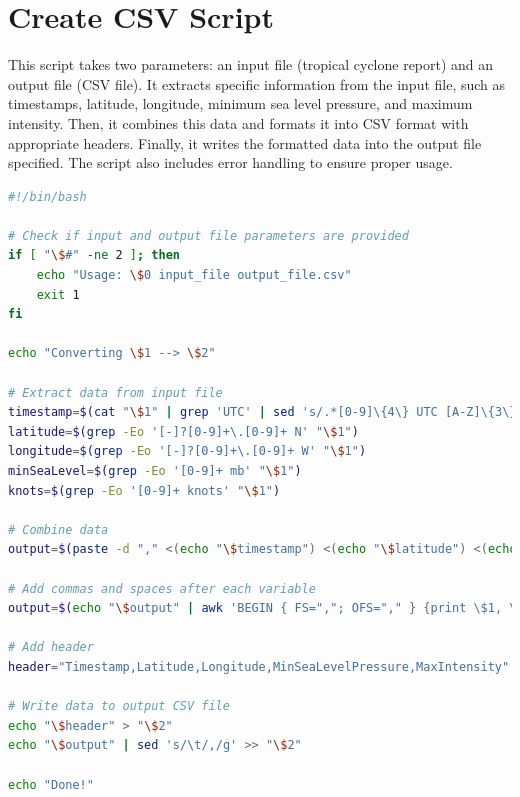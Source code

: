 \documentclass[]{article}
\begin{document}
\section{Create CSV Script}
\vspace{2cm}
This script takes two parameters: an input file (tropical cyclone report) and an output file (CSV file). It extracts specific information from the input file, such as timestamps, latitude, longitude, minimum sea level pressure, and maximum intensity. Then, it combines this data and formats it into CSV format with appropriate headers. Finally, it writes the formatted data into the output file specified. The script also includes error handling to ensure proper usage.
\vspace{1cm}
\begin{lstlisting}[language=bash, caption={create\_csv.sh}]
#!/bin/bash

# Check if input and output file parameters are provided
if [ "\$#" -ne 2 ]; then
    echo "Usage: \$0 input_file output_file.csv"
    exit 1
fi

echo "Converting \$1 --> \$2"

# Extract data from input file
timestamp=$(cat "\$1" | grep 'UTC' | sed 's/.*[0-9]\{4\} UTC [A-Z]\{3\} [0-9]\{2\}.*/\1/' | uniq)
latitude=$(grep -Eo '[-]?[0-9]+\.[0-9]+ N' "\$1")
longitude=$(grep -Eo '[-]?[0-9]+\.[0-9]+ W' "\$1")
minSeaLevel=$(grep -Eo '[0-9]+ mb' "\$1")
knots=$(grep -Eo '[0-9]+ knots' "\$1")

# Combine data
output=$(paste -d "," <(echo "\$timestamp") <(echo "\$latitude") <(echo "\$longitude") <(echo "\$minSeaLevel") <(echo "\$knots"))

# Add commas and spaces after each variable
output=$(echo "\$output" | awk 'BEGIN { FS=","; OFS="," } {print \$1, \$2, \$3, \$4, \$5}')

# Add header
header="Timestamp,Latitude,Longitude,MinSeaLevelPressure,MaxIntensity"

# Write data to output CSV file
echo "\$header" > "\$2"
echo "\$output" | sed 's/\t/,/g' >> "\$2"

echo "Done!"
\end{lstlisting}
\clearpage
\end{document}
